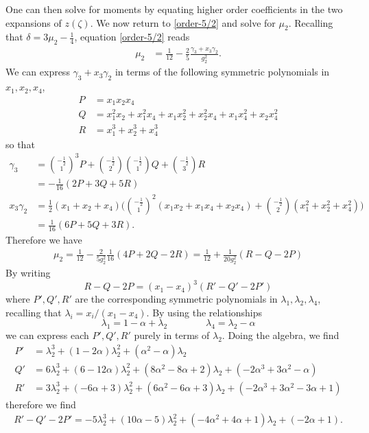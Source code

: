 \documentclass[10pt]{article}
\theoremstyle{plain}
\theoremstyle{definition}
\theoremstyle{plain}
\begin{document}
One can then solve for moments by equating higher order coefficients in the two expansions of $z(\zeta)$. We now return to \ref{order-5/2} and solve for $\mu_2$. Recalling that $\delta = 3\mu_2 - \frac{1}{4}$, equation \ref{order-5/2} reads
\begin{align*}
	\mu_2 &= \frac{1}{12} - \frac{2}{5}\frac{\gamma_3+x_3\gamma_2}{g_2^2}.
\end{align*}
We can express $\gamma_3 + x_3\gamma_2$ in terms of the following symmetric polynomials in $x_1,x_2,x_4$,
\begin{align*}
	P &= x_1x_2x_4 \\
	Q &= x_1^2x_2 + x_1^2x_4 + x_1x_2^2 + x_2^2x_4 + x_1x_4^2 + x_2x_4^2 \\
	R &= x_1^3 + x_2^3 + x_4^3
\end{align*}
so that 
\begin{align*}
	\gamma_3 &= {-\frac{1}{2}\choose 1}^3 P + {-\frac{1}{2} \choose 2}{-\frac{1}{2}\choose 1}Q + {-\frac{1}{2}\choose 3} R \\
	&= -\frac{1}{16}(2P+3Q+5R) \\
	x_3\gamma_2 &= \frac{1}{2}(x_1+x_2+x_4)\bigg( {-\frac{1}{2}\choose 1}^2(x_1x_2+x_1x_4 + x_2x_4) +{-\frac{1}{2}\choose 2}(x_1^2 + x_2^2 +x_4^2) \bigg) \\
	&= \frac{1}{16}( 6P + 5Q + 3R ).
\end{align*}
Therefore we have
\begin{align}
	\mu_2 = \frac{1}{12} - \frac{2}{5g_2^2}\frac{1}{16}(4P + 2Q - 2R) = \frac{1}{12}+\frac{1}{20g_2^2}(R-Q-2P) \label{mu2pqr}
\end{align}
By writing 
\[ R-Q-2P = (x_1-x_4)^3 (R'-Q'-2P') \]
where $P',Q',R'$ are the corresponding symmetric polynomials in $\lambda_1,\lambda_2,\lambda_4$, recalling that $\lambda_i = x_i/(x_1-x_4)$. By using the relationships 
\[ \lambda_1 = 1-\alpha+\lambda_2 \qquad\qquad \lambda_4 = \lambda_2 - \alpha \]
we can express each $P',Q',R'$ purely in terms of $\lambda_2$. Doing the algebra, we find
\begin{align*}
	P' &= \lambda_2^3 + (1-2\alpha)\lambda_2^2 + (\alpha^2-\alpha)\lambda_2\\
	Q' &= 6\lambda_2^3 + (6-12\alpha)\lambda_2^2 + (8\alpha^2 - 8\alpha + 2)\lambda_2 + (-2\alpha^3 + 3\alpha^2-\alpha) \\
	R' &= 3\lambda_2^3 + (-6\alpha+3)\lambda_2^2 +(6\alpha^2-6\alpha+3)\lambda_2 + (-2\alpha^3 + 3\alpha^2 - 3\alpha + 1) 
\end{align*}
therefore we find
\begin{align*}
	R'-Q'-2P' = -5\lambda_2^3 + (10\alpha-5)\lambda_2^2 + (-4\alpha^2+4\alpha+1)\lambda_2 + (-2\alpha+1).
\end{align*}
\end{document}
